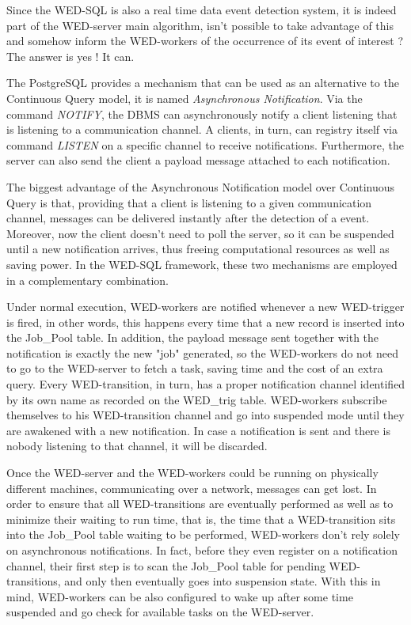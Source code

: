 \documentclass[conference]{IEEEtran}
\begin{document}
\par Since the WED-SQL is also a real time data event detection system, it is indeed part of the WED-server main algorithm,
isn't possible to take advantage of this and somehow inform the WED-workers of the occurrence of its event of interest ?
The answer is yes ! It can.    

\par The PostgreSQL provides a mechanism that can be used as an alternative to the Continuous Query model, it is named 
\emph{Asynchronous Notification}. Via the command \emph{NOTIFY}, the DBMS can asynchronously notify a client listening that 
is listening to a communication channel. A clients, in turn, can registry itself via command \emph{LISTEN} on a specific  
channel to receive notifications. Furthermore, the server can also send the client a payload message attached to each
notification. 

\par The biggest advantage of the Asynchronous Notification model over Continuous Query is that, providing that a client is 
listening to a given communication channel, messages can be delivered instantly after the detection of a event. Moreover,
now the client doesn't need to poll the server, so it can be suspended until a new notification arrives, thus freeing 
computational resources as well as saving power. In the WED-SQL framework, these two mechanisms are employed in a complementary
combination. 

\par Under normal execution, WED-workers are notified whenever a new WED-trigger is fired, in other words, this happens 
every time that a new record is inserted into the Job\_Pool table. In addition, the payload message sent together with
the notification is exactly the new "job" generated, so the WED-workers do not need to go to the WED-server to fetch a task,
saving time and the cost of an extra query. Every WED-transition, in turn, has a proper notification channel identified
by its own name as recorded on the WED\_trig table. WED-workers subscribe themselves to his WED-transition channel and 
go into suspended mode until they are awakened with a new notification. In case a notification is sent and there is nobody
listening to that channel, it will be discarded.  

\par Once the WED-server and the WED-workers could be running on physically different machines, communicating over a network, 
messages can get lost. In order to ensure that all WED-transitions are eventually performed as well as to minimize their waiting to run time,
that is, the time that a WED-transition sits into the Job\_Pool table waiting to be performed, WED-workers don't rely solely
on asynchronous notifications. In fact, before they even register on a notification channel, their first step is to scan
the Job\_Pool table for pending WED-transitions, and only then eventually goes into suspension state. With this in mind,
WED-workers can be also configured to wake up after some time suspended and go check for available tasks on the WED-server.
\end{document}
